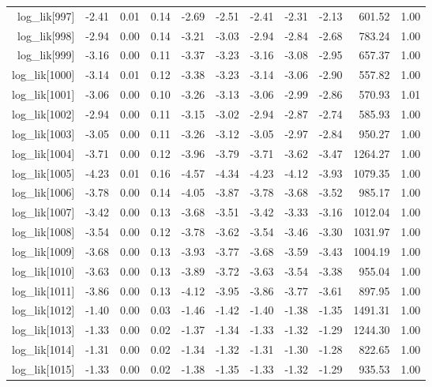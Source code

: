\begin{table}[ht]
\begin{tabular}{rrrrrrrrrrr}
  log\_lik[997] & -2.41 & 0.01 & 0.14 & -2.69 & -2.51 & -2.41 & -2.31 & -2.13 & 601.52 & 1.00 \\ 
  log\_lik[998] & -2.94 & 0.00 & 0.14 & -3.21 & -3.03 & -2.94 & -2.84 & -2.68 & 783.24 & 1.00 \\ 
  log\_lik[999] & -3.16 & 0.00 & 0.11 & -3.37 & -3.23 & -3.16 & -3.08 & -2.95 & 657.37 & 1.00 \\ 
  log\_lik[1000] & -3.14 & 0.01 & 0.12 & -3.38 & -3.23 & -3.14 & -3.06 & -2.90 & 557.82 & 1.00 \\ 
  log\_lik[1001] & -3.06 & 0.00 & 0.10 & -3.26 & -3.13 & -3.06 & -2.99 & -2.86 & 570.93 & 1.01 \\ 
  log\_lik[1002] & -2.94 & 0.00 & 0.11 & -3.15 & -3.02 & -2.94 & -2.87 & -2.74 & 585.93 & 1.00 \\ 
  log\_lik[1003] & -3.05 & 0.00 & 0.11 & -3.26 & -3.12 & -3.05 & -2.97 & -2.84 & 950.27 & 1.00 \\ 
  log\_lik[1004] & -3.71 & 0.00 & 0.12 & -3.96 & -3.79 & -3.71 & -3.62 & -3.47 & 1264.27 & 1.00 \\ 
  log\_lik[1005] & -4.23 & 0.01 & 0.16 & -4.57 & -4.34 & -4.23 & -4.12 & -3.93 & 1079.35 & 1.00 \\ 
  log\_lik[1006] & -3.78 & 0.00 & 0.14 & -4.05 & -3.87 & -3.78 & -3.68 & -3.52 & 985.17 & 1.00 \\ 
  log\_lik[1007] & -3.42 & 0.00 & 0.13 & -3.68 & -3.51 & -3.42 & -3.33 & -3.16 & 1012.04 & 1.00 \\ 
  log\_lik[1008] & -3.54 & 0.00 & 0.12 & -3.78 & -3.62 & -3.54 & -3.46 & -3.30 & 1031.97 & 1.00 \\ 
  log\_lik[1009] & -3.68 & 0.00 & 0.13 & -3.93 & -3.77 & -3.68 & -3.59 & -3.43 & 1004.19 & 1.00 \\ 
  log\_lik[1010] & -3.63 & 0.00 & 0.13 & -3.89 & -3.72 & -3.63 & -3.54 & -3.38 & 955.04 & 1.00 \\ 
  log\_lik[1011] & -3.86 & 0.00 & 0.13 & -4.12 & -3.95 & -3.86 & -3.77 & -3.61 & 897.95 & 1.00 \\ 
  log\_lik[1012] & -1.40 & 0.00 & 0.03 & -1.46 & -1.42 & -1.40 & -1.38 & -1.35 & 1491.31 & 1.00 \\ 
  log\_lik[1013] & -1.33 & 0.00 & 0.02 & -1.37 & -1.34 & -1.33 & -1.32 & -1.29 & 1244.30 & 1.00 \\ 
  log\_lik[1014] & -1.31 & 0.00 & 0.02 & -1.34 & -1.32 & -1.31 & -1.30 & -1.28 & 822.65 & 1.00 \\ 
  log\_lik[1015] & -1.33 & 0.00 & 0.02 & -1.38 & -1.35 & -1.33 & -1.32 & -1.29 & 935.53 & 1.00 \\ 

\end{tabular}
\end{table}
